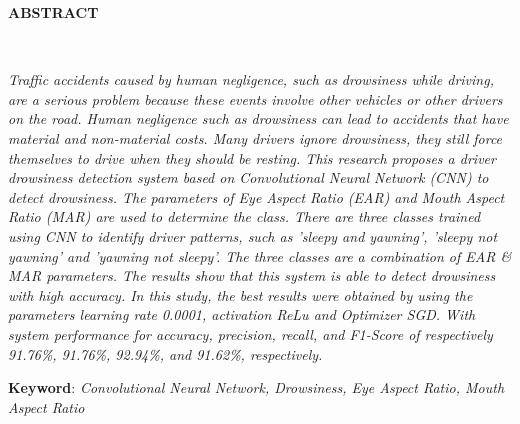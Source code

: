 \clearpage

\begin{minipage}{\textwidth}

\centering
\end{minipage}

\vspace{1em}

\normalsize \bfseries \centering \MakeUppercase{Abstract}
% 
\\[2\baselineskip]

\justifying \normalfont \normalsize

{

\textit{Traffic accidents caused by human negligence, such as 
drowsiness while driving, are a serious problem because these 
events involve other vehicles or other drivers on the road. 
Human negligence such as drowsiness can lead to accidents that
 have material and non-material costs. Many drivers ignore 
 drowsiness, they still force themselves to drive when they 
 should be resting. This research proposes a driver drowsiness 
 detection system based on Convolutional Neural Network (CNN) 
 to detect drowsiness. The parameters of Eye Aspect Ratio (EAR) 
 and Mouth Aspect Ratio (MAR) are used to determine the class. 
 There are three classes trained using CNN to identify driver 
 patterns, such as 'sleepy and yawning', 'sleepy not yawning' 
 and 'yawning not sleepy'. The three classes 
are a combination of EAR \& MAR parameters. 
The results show that this system is able to detect drowsiness 
with high accuracy. In this study, the best results were 
obtained by using the parameters \textit{learning rate} 0.0001, 
\textit{activation} ReLu and \textit{Optimizer} SGD. 
With system performance for accuracy, precision, recall, 
and F1-Score of respectively 
91.76\%, 91.76\%, 92.94\%, and 91.62\%, respectively.
}

}

\textbf{Keyword}: \textit{Convolutional Neural Network, Drowsiness, Eye Aspect Ratio, Mouth
Aspect Ratio}

\clearpage